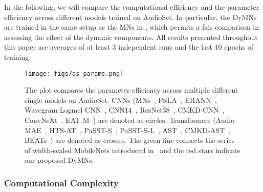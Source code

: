\documentclass[lettersize,journal]{IEEEtran}
\begin{document}
In the following, we will compare the computational efficiency and the parameter efficiency across different models trained on AudioSet.
In particular, the DyMNs are trained in the same setup as the MNs in \cite{Schmid22Efficient}, which permits a fair comparison in assessing the effect of the dynamic components. All results presented throughout this paper are averages of at least 3 independent runs and the last 10 epochs of training.

\begin{figure}[t]
\centering
{\texttt{[image: figs/as\_params.png]}}
\caption{The plot compares the parameter-efficiency across multiple different single models on AudioSet\cite{audioset2017Gemmeke}. CNNs (MNs~\cite{Schmid22Efficient}, PSLA~\cite{Gong21PSLA}, ERANN~\cite{Verbitskiy21ERANN}, Wavegram-Logmel CNN~\cite{Kong20PANNs}, CNN14~\cite{Kong20PANNs}, ResNet38~\cite{Kong20PANNs}, CMKD-CNN~\cite{Gong22CMKD}, ConvNeXt~\cite{pellegrini2023adapting}, EAT-M~\cite{gazneli2022end}) are denoted as circles. Transformers (Audio-MAE~\cite{Huang22Masked}, HTS-AT~\cite{Chen22HTS-AT}, PaSST-S~\cite{Koutini21Passt}, PaSST-S-L~\cite{Koutini21Passt}, AST~\cite{Gong21Ast}, CMKD-AST~\cite{Gong22CMKD}, BEATs~\cite{chen2022beats}) are denoted as crosses. The green line connects the series of width-scaled MobileNets introduced in~\cite{Schmid22Efficient} and the red stars indicate our proposed DyMNs.}\label{fig:parameter_comp}\end{figure}

\subsubsection{Computational Complexity} 
\end{document}
